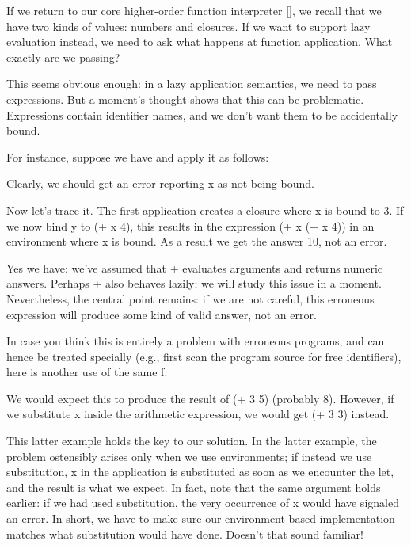 
If we return to our core higher-order function interpreter \ref{}, we recall
that we have two kinds of values: numbers and closures. If we want to support
lazy evaluation instead, we need to ask what happens at function application.
What exactly are we passing?

This seems obvious enough: in a lazy application semantics, we need to pass
expressions. But a moment’s thought shows that this can be problematic.
Expressions contain identifier names, and we don’t want them to be accidentally
bound.

For instance, suppose we have
and apply it as follows:

Clearly, we should get an error reporting x as not being bound.

Now let’s trace it. The first application creates a closure where x is bound to
3. If we now bind y to (+ x 4), this results in the expression (+ x (+ x 4)) in
an environment where x is bound. As a result we get the answer 10, not an error.


Yes we have: we’ve assumed that + evaluates arguments and returns numeric
answers. Perhaps + also behaves lazily; we will study this issue in a moment.
Nevertheless, the central point remains: if we are not careful, this erroneous
expression will produce some kind of valid answer, not an error.

In case you think this is entirely a problem with erroneous programs, and can
hence be treated specially (e.g., first scan the program source for free
identifiers), here is another use of the same f:

We would expect this to produce the result of (+ 3 5) (probably 8). However, if
we substitute x inside the arithmetic expression, we would get (+ 3 3) instead.

This latter example holds the key to our solution. In the latter example, the
problem ostensibly arises only when we use environments; if instead we use
substitution, x in the application is substituted as soon as we encounter the
let, and the result is what we expect. In fact, note that the same argument
holds earlier: if we had used substitution, the very occurrence of x would have
signaled an error. In short, we have to make sure our environment-based
implementation matches what substitution would have done.
Doesn’t that sound familiar!

